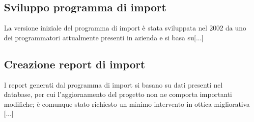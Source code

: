 \subsection{Sviluppo programma di import}
La versione iniziale del programma di import è stata sviluppata nel 2002 da uno dei programmatori attualmente presenti in azienda e si basa su[...] \\


\subsection{Creazione report di import}
I report generati dal programma di import si basano su dati presenti nel database, per cui l'aggiornamento del progetto non ne comporta importanti modifiche; è comunque stato richiesto un minimo intervento in ottica migliorativa [...]\\